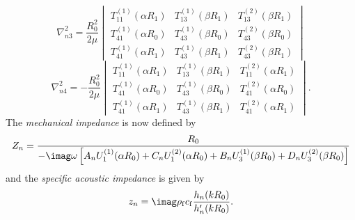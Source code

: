 \begin{equation*}
	\nabla^2_{n3} = \frac{R_0^2}{2\mu}\begin{vmatrix}
		T_{11}^{(1)}(\alpha R_1) & T_{13}^{(1)}(\beta R_1) & T_{13}^{(2)}(\beta R_1)\\
		T_{41}^{(1)}(\alpha R_0) & T_{43}^{(1)}(\beta R_0) & T_{43}^{(2)}(\beta R_0)\\
		T_{41}^{(1)}(\alpha R_1) & T_{43}^{(1)}(\beta R_1) & T_{43}^{(2)}(\beta R_1)
	\end{vmatrix}
\end{equation*}
\begin{equation*}
	\nabla^2_{n4} = -\frac{R_0^2}{2\mu}\begin{vmatrix}
		T_{11}^{(1)}(\alpha R_1) & T_{13}^{(1)}(\beta R_1) & T_{11}^{(2)}(\alpha R_1)\\
		T_{41}^{(1)}(\alpha R_0) & T_{43}^{(1)}(\beta R_0) & T_{41}^{(2)}(\alpha R_0)\\
		T_{41}^{(1)}(\alpha R_1) & T_{43}^{(1)}(\beta R_1) & T_{41}^{(2)}(\alpha R_1)
	\end{vmatrix}.
\end{equation*}
The \textit{mechanical impedance} is now defined by
\begin{equation*}
	Z_n=\frac{R_0}{-\imag\omega\left[A_n U_1^{(1)}(\alpha R_0) + C_n U_1^{(2)}(\alpha R_0) + B_n U_3^{(1)}(\beta R_0) + D_n U_3^{(2)}(\beta R_0)\right]}
\end{equation*}
and the \textit{specific acoustic impedance} is given by
\begin{equation*}
	z_n = \imag\rho_{\mathrm{f}} c_{\mathrm{f}}\frac{h_n(kR_0)}{h_n'(kR_0)}.
\end{equation*}

